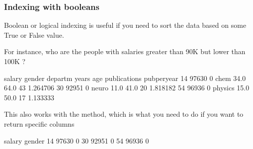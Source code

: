 \documentclass[letterpaper,10pt,english]{sphinxmanual}
\begin{document}
\subsubsection{Indexing with booleans}
\label{\detokenize{content/Introduction_to_Pandas:indexing-with-booleans}}
Boolean or logical indexing is useful if you need to sort the data based on some True or False value.

For instance, who are the people with salaries greater than 90K but lower than 100K ?

\begin{sphinxVerbatim}[commandchars=\\\{\}]
\PYG{p}{[}       \PYG{p}{]}
\end{sphinxVerbatim}

\begin{sphinxVerbatim}[commandchars=\\\{\}]
    salary  gender  departm  years   age  publications  pubperyear
14   97630       0     chem   34.0  64.0            43    1.264706
30   92951       0    neuro   11.0  41.0            20    1.818182
54   96936       0  physics   15.0  50.0            17    1.133333
\end{sphinxVerbatim}

This also works with the  method, which is what you need to do if you want to return specific columns

\begin{sphinxVerbatim}[commandchars=\\\{\}]
\PYG{p}{[}        \PYG{p}{[} \PYG{p}{]}\PYG{p}{]}
\end{sphinxVerbatim}

\begin{sphinxVerbatim}[commandchars=\\\{\}]
    salary  gender
14   97630       0
30   92951       0
54   96936       0
\end{sphinxVerbatim}
\end{document}
